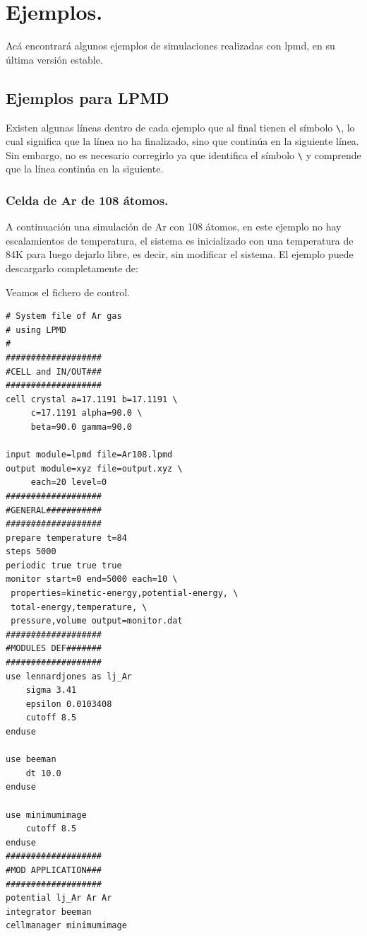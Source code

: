 \chapter{Ejemplos.}
\label{chap:exa}

Ac\'a encontrar\'a algunos ejemplos de simulaciones realizadas con lpmd, en su \'ultima versi\'on estable.

\section{Ejemplos para LPMD}

Existen algunas l\'ineas dentro de cada ejemplo que al final tienen el s\'imbolo \verb|\|, lo cual significa que la l\'inea no ha finalizado, sino que contin\'ua en la siguiente l\'inea. Sin embargo, no es necesario corregirlo ya que {\lpmd} identifica el s\'imbolo \verb|\| y comprende que la l\'inea contin\'ua en la siguiente.

\subsection{Celda de Ar de 108 \'atomos.}

A continuaci\'on una simulaci\'on de Ar con 108 \'atomos, en este ejemplo no hay escalamientos de temperatura, el sistema es inicializado con una temperatura de 84K para luego dejarlo libre, es decir, sin modificar el sistema. El ejemplo puede descargarlo completamente de:


Veamos el fichero de control.

\begin{multicols}{2}
\setlength{\columnseprule}{.5pt}
\begin{verbatim}
# System file of Ar gas 
# using LPMD
#
###################
#CELL and IN/OUT###
###################
cell crystal a=17.1191 b=17.1191 \
     c=17.1191 alpha=90.0 \
     beta=90.0 gamma=90.0

input module=lpmd file=Ar108.lpmd
output module=xyz file=output.xyz \
     each=20 level=0
###################
#GENERAL###########
###################
prepare temperature t=84
steps 5000
periodic true true true
monitor start=0 end=5000 each=10 \
 properties=kinetic-energy,potential-energy, \
 total-energy,temperature, \
 pressure,volume output=monitor.dat
###################
#MODULES DEF#######
###################
use lennardjones as lj_Ar
    sigma 3.41
    epsilon 0.0103408
    cutoff 8.5
enduse

use beeman
    dt 10.0
enduse

use minimumimage
    cutoff 8.5
enduse
###################
#MOD APPLICATION###
###################
potential lj_Ar Ar Ar
integrator beeman
cellmanager minimumimage
\end{verbatim}
\end{multicols}


